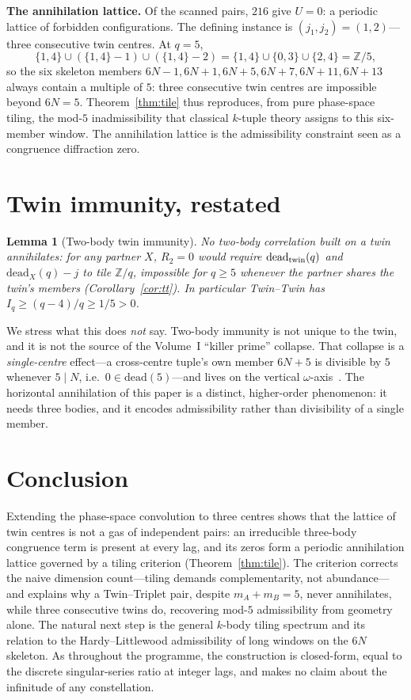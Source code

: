 \documentclass[11pt,a4paper]{article}
\newtheorem{lemma}{Lemma}
\begin{document}
\noindent\textbf{The annihilation lattice.} Of the scanned pairs, $216$ give
$U=0$: a periodic lattice of forbidden configurations. The defining instance is
$(j_1,j_2)=(1,2)$---three consecutive twin centres. At $q=5$,
\[
  \{1,4\}\cup(\{1,4\}-1)\cup(\{1,4\}-2)=\{1,4\}\cup\{0,3\}\cup\{2,4\}=\mathbb{Z}/5,
\]
so the six skeleton members $6N-1,6N+1,6N+5,6N+7,6N+11,6N+13$ always contain a
multiple of $5$: three consecutive twin centres are impossible beyond $6N=5$.
Theorem~\ref{thm:tile} thus reproduces, from pure phase-space tiling, the
mod-$5$ inadmissibility that classical $k$-tuple theory assigns to this
six-member window. The annihilation lattice is the admissibility constraint seen
as a congruence diffraction zero.

\section{Twin immunity, restated}
\begin{lemma}[Two-body twin immunity]
No two-body correlation built on a twin annihilates: for any partner $X$,
$R_2=0$ would require $\mathrm{dead}_{\rm twin}(q)$ and $\mathrm{dead}_X(q)-j$ to
tile $\mathbb{Z}/q$, impossible for $q\ge5$ whenever the partner shares the twin's
members (Corollary~\ref{cor:tt}). In particular Twin--Twin has
$I_q\ge(q-4)/q\ge1/5>0$.
\end{lemma}

We stress what this does \emph{not} say. Two-body immunity is not unique to the
twin, and it is not the source of the Volume~I ``killer prime'' collapse. That
collapse is a \emph{single-centre} effect---a cross-centre tuple's own member
$6N+5$ is divisible by $5$ whenever $5\mid N$, i.e.\ $0\in\mathrm{dead}(5)$---and
lives on the vertical $\omega$-axis~\cite{ChenXVII}. The horizontal annihilation
of this paper is a distinct, higher-order phenomenon: it needs three bodies, and
it encodes admissibility rather than divisibility of a single member.

\section{Conclusion}
Extending the phase-space convolution to three centres shows that the lattice of
twin centres is not a gas of independent pairs: an irreducible three-body
congruence term is present at every lag, and its zeros form a periodic
annihilation lattice governed by a tiling criterion (Theorem~\ref{thm:tile}). The
criterion corrects the naive dimension count---tiling demands complementarity, not
abundance---and explains why a Twin--Triplet pair, despite $m_A+m_B=5$, never
annihilates, while three consecutive twins do, recovering mod-$5$ admissibility
from geometry alone. The natural next step is the general $k$-body tiling spectrum
and its relation to the Hardy--Littlewood admissibility of long windows on the
$6N$ skeleton. As throughout the programme, the construction is closed-form, equal
to the discrete singular-series ratio at integer lags, and makes no claim about
the infinitude of any constellation.
\end{document}
